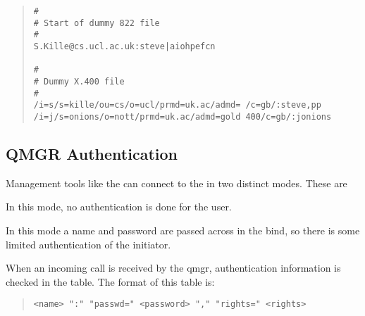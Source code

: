 \begin{quote}\small\begin {verbatim}
#
# Start of dummy 822 file
#
S.Kille@cs.ucl.ac.uk:steve|aiohpefcn

#
# Dummy X.400 file
#
/i=s/s=kille/ou=cs/o=ucl/prmd=uk.ac/admd= /c=gb/:steve,pp
/i=j/s=onions/o=nott/prmd=uk.ac/admd=gold 400/c=gb/:jonions
\end{verbatim}\end{quote}


\subsection{QMGR Authentication}

Management tools like the  can connect to the
 in two distinct 
modes. These are
\begin{describe}
\item[\verb|no authentication|:] In this mode, no authentication is
done for the user.

\item[\verb|weak authentication|:] In this mode a name and password
are passed across in the bind, so there is some limited authentication
of the initiator.
\end{describe}

When an incoming call is received by the qmgr, authentication
information is checked in the  table.
The format of this table is:
\begin{quote}\small\begin{verbatim}
<name> ":" "passwd=" <password> "," "rights=" <rights>
\end{verbatim}\end{quote}

